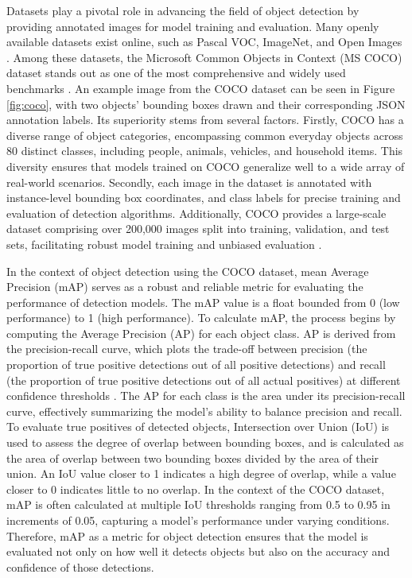 \documentclass[journal,onecolumn,12pt]{IEEEtran}
\begin{document}
Datasets play a pivotal role in advancing the field of object detection by providing annotated images for model training and evaluation. Many openly available datasets exist online, such as Pascal VOC, ImageNet, and Open Images \cite{zaidi2021survey}. Among these datasets, the Microsoft Common Objects in Context (MS COCO) dataset stands out as one of the most comprehensive and widely used benchmarks \cite{lin2015microsoft}. An example image from the COCO dataset can be seen in Figure \ref{fig:coco}, with two objects' bounding boxes drawn and their corresponding JSON annotation labels. Its superiority stems from several factors. Firstly, COCO has a diverse range of object categories, encompassing common everyday objects across 80 distinct classes, including people, animals, vehicles, and household items. This diversity ensures that models trained on COCO generalize well to a wide array of real-world scenarios. Secondly, each image in the dataset is annotated with instance-level bounding box coordinates, and class labels for precise training and evaluation of detection algorithms. Additionally, COCO provides a large-scale dataset comprising over 200,000 images split into training, validation, and test sets, facilitating robust model training and unbiased evaluation \cite{lin2015microsoft}.

In the context of object detection using the COCO dataset, mean Average Precision (mAP) serves as a robust and reliable metric for evaluating the performance of detection models. The mAP value is a float bounded from 0 (low performance) to 1 (high performance). To calculate mAP, the process begins by computing the Average Precision (AP) for each object class. AP is derived from the precision-recall curve, which plots the trade-off between precision (the proportion of true positive detections out of all positive detections) and recall (the proportion of true positive detections out of all actual positives) at different confidence thresholds \cite{map}. The AP for each class is the area under its precision-recall curve, effectively summarizing the model's ability to balance precision and recall. To evaluate true positives of detected objects, Intersection over Union (IoU) is used to assess the degree of overlap between bounding boxes, and is calculated as the area of overlap between two bounding boxes divided by the area of their union. An IoU value closer to 1 indicates a high degree of overlap, while a value closer to 0 indicates little to no overlap. In the context of the COCO dataset, mAP is often calculated at multiple IoU thresholds ranging from 0.5 to 0.95 in increments of 0.05, capturing a model's performance under varying conditions. Therefore, mAP as a metric for object detection ensures that the model is evaluated not only on how well it detects objects but also on the accuracy and confidence of those detections.
\end{document}
